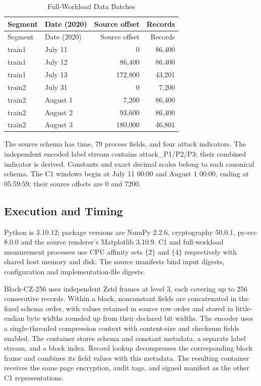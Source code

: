 \documentclass[10pt,journal,onecolumn]{IEEEtran}
\begin{document}
\begin{longtable}{@{}llrr@{}}
\caption{Full-Workload Data Batches}\label{tab:batches}\\
\toprule Segment & Date (2020) & Source offset & Records\\\midrule\endfirsthead
\toprule Segment & Date (2020) & Source offset & Records\\\midrule\endhead
train1 & July 11 & 0 & 86,400\\
train1 & July 12 & 86,400 & 86,400\\
train1 & July 13 & 172,800 & 43,201\\
train2 & July 31 & 0 & 7,200\\
train2 & August 1 & 7,200 & 86,400\\
train2 & August 2 & 93,600 & 86,400\\
train2 & August 3 & 180,000 & 46,801\\\bottomrule
\end{longtable}

The source schema has time, 79 process fields, and four attack indicators.
The independent encoded label stream contains attack\_P1/P2/P3; their
combined indicator is derived. Constants and exact decimal scales belong
to each canonical schema. The C1 windows begin at July 11 00:00 and August 1
00:00, ending at 05:59:59; their source offsets are 0 and 7200.

\subsection{Execution and Timing}
Python is 3.10.12; package versions are NumPy 2.2.6, cryptography 50.0.1,
py-ecc 8.0.0 and the source renderer's Matplotlib 3.10.9. C1 and full-workload
measurement processes use CPU affinity sets $\{2\}$ and $\{4\}$ respectively
with shared host memory and disk. The source manifests bind input digests,
configuration and implementation-file digests.

Block-CZ-256 uses independent Zstd frames at level 3, each covering up to
256 consecutive records. Within a block, nonconstant fields are concatenated
in the fixed schema order, with values retained in source row order and
stored in little-endian byte widths rounded up from their declared bit widths.
The encoder uses a single-threaded compression context with content-size and
checksum fields enabled. The container stores schema and constant metadata,
a separate label stream, and a block index. Record lookup decompresses the
corresponding block frame and combines its field values with this metadata.
The resulting container receives the same page encryption, audit tags, and
signed manifest as the other C1 representations.
\end{document}
